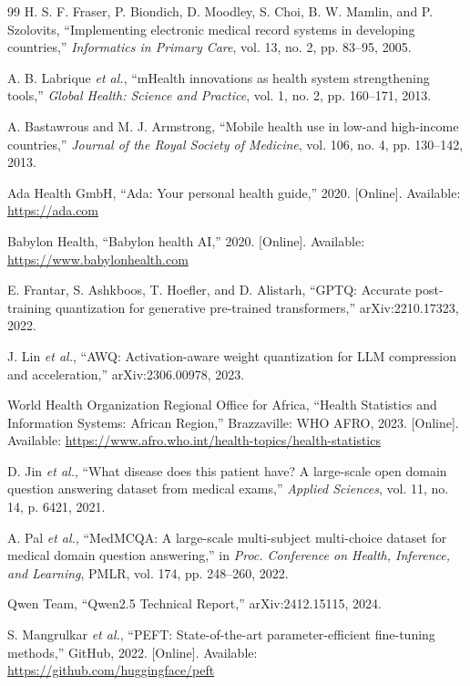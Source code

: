 \documentclass[conference]{IEEEtran}
\begin{document}
\begin{thebibliography}{99}
H. S. F. Fraser, P. Biondich, D. Moodley, S. Choi, B. W. Mamlin, and P. Szolovits,
``Implementing electronic medical record systems in developing countries,''
\textit{Informatics in Primary Care}, vol. 13, no. 2, pp. 83--95, 2005.

A. B. Labrique \textit{et al.},
``mHealth innovations as health system strengthening tools,''
\textit{Global Health: Science and Practice}, vol. 1, no. 2, pp. 160--171, 2013.

A. Bastawrous and M. J. Armstrong,
``Mobile health use in low-and high-income countries,''
\textit{Journal of the Royal Society of Medicine}, vol. 106, no. 4,
pp. 130--142, 2013.

Ada Health GmbH, ``Ada: Your personal health guide,'' 2020.
[Online]. Available: \url{https://ada.com}

Babylon Health, ``Babylon health AI,'' 2020.
[Online]. Available: \url{https://www.babylonhealth.com}

E. Frantar, S. Ashkboos, T. Hoefler, and D. Alistarh,
``GPTQ: Accurate post-training quantization for generative pre-trained transformers,''
arXiv:2210.17323, 2022.

J. Lin \textit{et al.},
``AWQ: Activation-aware weight quantization for LLM compression and acceleration,''
arXiv:2306.00978, 2023.

World Health Organization Regional Office for Africa,
``Health Statistics and Information Systems: African Region,''
Brazzaville: WHO AFRO, 2023.
[Online]. Available: \url{https://www.afro.who.int/health-topics/health-statistics}

D. Jin \textit{et al.},
``What disease does this patient have? A large-scale open domain question answering dataset from medical exams,''
\textit{Applied Sciences}, vol. 11, no. 14, p. 6421, 2021.

A. Pal \textit{et al.},
``MedMCQA: A large-scale multi-subject multi-choice dataset for medical domain question answering,''
in \textit{Proc. Conference on Health, Inference, and Learning},
PMLR, vol. 174, pp. 248--260, 2022.

Qwen Team, ``Qwen2.5 Technical Report,'' arXiv:2412.15115, 2024.

S. Mangrulkar \textit{et al.},
``PEFT: State-of-the-art parameter-efficient fine-tuning methods,''
GitHub, 2022. [Online]. Available: \url{https://github.com/huggingface/peft}


\end{thebibliography}
\end{document}
